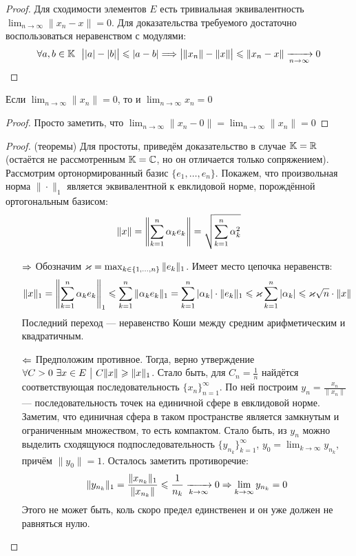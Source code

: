 \begin{proof}
	Для сходимости элементов $E$ есть тривиальная эквивалентность \\ $\lim_{n \to \infty} \|x_n - x\| = 0$. Для доказательства требуемого достаточно воспользоваться неравенством с модулями:
	\[
		\forall a, b \in \mathbb{K}\ \ \big||a| - |b|\big| \leqslant |a - b| \Longrightarrow \big|\|x_n\| - \|x\|\big| \leqslant \|x_n - x\| \xrightarrow[n \to \infty]{} 0
	\]
\end{proof}

\begin{proposition}
	Если $\lim_{n \to \infty} \|x_n\| = 0$, то и $\lim_{n \to \infty} x_n = 0$
\end{proposition}

\begin{proof}
	Просто заметить, что $\lim_{n \to \infty} \|x_n - 0\| = \lim_{n \to \infty} \|x_n\| = 0$
\end{proof}

\begin{proof} (теоремы)
	Для простоты, приведём доказательство в случае $\mathbb{K} = \mathbb{R}$ (остаётся не рассмотренным $\mathbb{K} = \mathbb{C}$, но он отличается только сопряжением). Рассмотрим ортонормированный базис $\{e_1, \ldots, e_n\}$. Покажем, что произвольная норма $\|\cdot\|_1$ является эквивалентной к евклидовой норме, порождённой ортогональным базисом:
	\[
		\|x\| = \left\|\sum_{k = 1}^n \alpha_k e_k\right\| = \sqrt{\sum_{k = 1}^n \alpha_k^2}
	\]
	\begin{itemize}
		\item[$\Rightarrow$] Обозначим $\varkappa = \max_{k \in \{1, \ldots, n\}} \|e_k\|_1$. Имеет место цепочка неравенств:
		\[
			\|x\|_1 = \left\|\sum_{k = 1}^n \alpha_ke_k\right\|_1 \leqslant \sum_{k = 1}^n \|\alpha_ke_k\|_1 = \sum_{k = 1}^n |\alpha_k| \cdot \|e_k\|_1 \leqslant \varkappa \sum_{k = 1}^n |\alpha_k| \leqslant \varkappa \sqrt{n} \cdot \|x\|
		\]
		Последний переход --- неравенство Коши между средним арифметическим и квадратичным.
		
		\item[$\Leftarrow$] Предположим противное. Тогда, верно утверждение $\forall C > 0\ \exists x \in E \ \big|\  C\|x\| \geqslant \|x\|_1$. Стало быть, для $C_n = \frac{1}{n}$ найдётся соответствующая последовательность $\{x_n\}_{n = 1}^\infty$. По ней построим $y_n = \frac{x_n}{\|x_n\|}$ --- последовательность точек на единичной сфере в евклидовой норме. Заметим, что единичная сфера в таком пространстве является замкнутым и ограниченным множеством, то есть компактом. Стало быть, из $y_n$ можно выделить сходящуюся подпоследовательность $\{y_{n_k}\}_{k = 1}^\infty$, $y_0 = \lim_{k \to \infty} y_{n_k}$, причём $\|y_0\| = 1$. Осталось заметить противоречие:
		\[
			\|y_{n_k}\|_1 = \frac{\|x_{n_k}\|_1}{\|x_{n_k}\|} \leqslant \frac{1}{n_k} \xrightarrow[k \to \infty]{} 0 \Rightarrow \lim_{k \to \infty} y_{n_k} = 0
		\]
		Этого не может быть, коль скоро предел единственен и он уже должен не равняться нулю.
	\end{itemize}
\end{proof}

